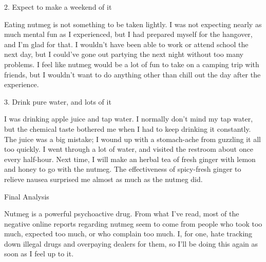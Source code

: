 \documentclass[letterpaper,12pt]{article}
\begin{document}
2. Expect to make a weekend of it



Eating nutmeg is not something to be taken lightly.  I was not expecting nearly as much mental fun as I experienced, but I had prepared myself for the hangover, and I'm glad for that.  I wouldn't have been able to work or attend school the next day, but I could've gone out partying the next night without too many problems.  I feel like nutmeg would be a lot of fun to take on a camping trip with friends, but I wouldn't want to do anything other than chill out the day after the experience.



3. Drink pure water, and lots of it



I was drinking apple juice and tap water.  I normally don't mind my tap water, but the chemical taste bothered me when I had to keep drinking it constantly.  The juice was a big mistake; I wound up with a stomach-ache from guzzling it all too quickly.  I went through a lot of water, and visited the restroom about once every half-hour.  Next time, I will make an herbal tea of fresh ginger with lemon and honey to go with the nutmeg.  The effectiveness of spicy-fresh ginger to relieve nausea surprised me almost as much as the nutmeg did.



Final Analysis



Nutmeg is a powerful psychoactive drug.  From what I've read, most of the negative online reports regarding nutmeg seem to come from people who took too much, expected too much, or who complain too much.  I, for one, hate tracking down illegal drugs and overpaying dealers for them, so I'll be doing this again as soon as I feel up to it.
\end{document}
